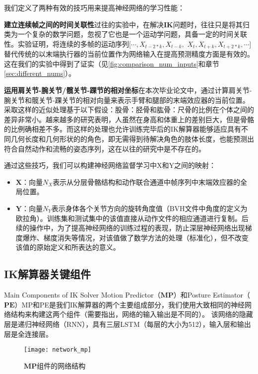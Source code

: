 我们定义了两种有效的技巧用来提高神经网络的学习性能：

\textbf{建立连续帧之间的时间关联性}过往的实验中，在解决\textbf{IK}问题时，往往只是将其归类为一个复杂的数学问题，忽视了它也是一个运动学问题，具备一定的时间关联性。实验证明，将连续的多帧的运动序列$[\cdots, X_{t-2*k}, X_{t-k},$ $ X_{t}, X_{t+k}, X_{t+2*k},\cdots]$替代传统的以末端执行器的当前位置作为网络输入在提高预测精度方面是有效的。 这在我们的实验中得到了证实（见\cref{fig:comparison_num_inputs}和章节\ref{sec:different_nums}）。

\textbf{运用肩关节-腕关节/髋关节-踝节的相对坐标}在本次毕业论文中，通过计算肩关节-腕关节和髋关节-踝关节的相对向量来表示手臂和腿部的末端效应器的当前位置。采取这样的近似处理基于以下假设：股骨：胫骨和肱骨：尺骨的比例在个体之间的差异非常小。越来越多的研究表明，人虽然在身高和体重上的差别巨大，但是骨骼的比例确相差不多。而这样的处理也允许训练完毕后的IK解算器能够适应具有不同几何长度和几何形状的的角色，即无需得到待解决角色的肢体长度，也能预测出符合自然动作和流畅的姿态序列，这在以往的研究中是不存在的。

通过这些技巧，我们可以构建神经网络监督学习中\*X和\*Y之间的映射：

\begin{itemize}
\item $\mathbf{X}$：向量$N_X$表示从分层骨骼结构和动作联合通道中帧序列中末端效应器的全局位置。
\item $\mathbf{Y}$：向量$N_Y$表示身体各个关节方向的旋转角度值（BVH文件中角度的定义为欧拉角）。训练集和测试集中的该值直接从动作文件的相应通道进行复制。后续的操作中，为了提高神经网络的训练过程的表现，防止深层神经网络出现梯度爆炸、梯度消失等情况，对该值做了数学方法的处理（标准化），但不改变该值的原始定义和所表达的意义。
\end{itemize}

\subsection{IK解算器关键组件}{Main Components of IK Solver}
\label{sec:components}
Motion Predictor（$\mathbf{MP}$）和Posture Estimator（$\mathbf{PE}$）MP和PE是我们IK解算器的两个主要组成部分，我们使用大致相同的神经网络结构来构建这两个组件（需要指出，网络的输入输出是不同的）。 该网络的隐藏层是递归神经网络（RNN），具有三层LSTM（每层的大小为512），输入层和输出层是全连接层。

\begin{figure}[!h]
	\centering
	\texttt{[image: network\_mp]}
	\caption[]{\label{fig:network_mp}
	$\mathbf{MP}$组件的网络结构
	}
\end{figure}
